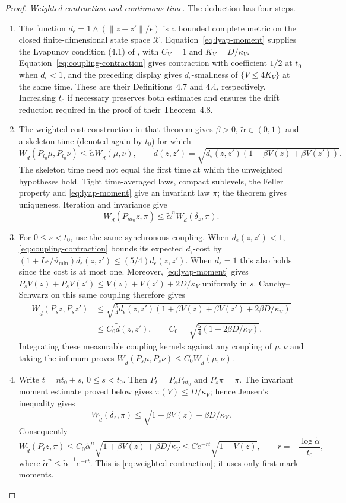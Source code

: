 \begin{proof}
\emph{Weighted contraction and continuous time.} The deduction has four steps.
\begin{enumerate}
\item The function $d_\epsilon=1\wedge(\|z-z'\|/\epsilon)$ is a bounded
complete metric on the closed finite-dimensional state space $\mathcal X$.
Equation~\eqref{eq:lyap-moment} supplies the Lyapunov condition (4.1) of
\citet{HairerMattinglyScheutzow2011}, with $C_V=1$ and $K_V=D/\kappa_V$.
Equation~\eqref{eq:coupling-contraction} gives contraction with coefficient
$1/2$ at $t_0$ when $d_\epsilon<1$, and the preceding display gives
$d_\epsilon$-smallness of $\{V\leq4K_V\}$ at the same time. These are their
Definitions~4.7 and 4.4, respectively. Increasing $t_0$ if necessary preserves
both estimates and ensures the drift reduction required in the proof of their
Theorem~4.8.
\item The weighted-cost construction in that theorem gives $\beta>0$,
$\widetilde\alpha\in(0,1)$ and a skeleton time (denoted again by $t_0$) for
which
\[
 W_{\widetilde d}(P_{t_0}\mu,P_{t_0}\nu)
 \leq\widetilde\alpha W_{\widetilde d}(\mu,\nu),\qquad
 \widetilde d(z,z')=\sqrt{d_\epsilon(z,z')
                  (1+\beta V(z)+\beta V(z'))}.
\]
The skeleton time need not equal the first time at which the unweighted
hypotheses hold. Tight time-averaged laws, compact sublevels, the Feller
property and \eqref{eq:lyap-moment} give an invariant law $\pi$; the theorem
gives uniqueness. Iteration and invariance give
\[
 W_{\widetilde d}(P_{nt_0}z,\pi)
 \leq\widetilde\alpha^n W_{\widetilde d}(\delta_z,\pi).
\]
\item For $0\leq s<t_0$, use the same synchronous coupling. When
$d_\epsilon(z,z')<1$, \eqref{eq:coupling-contraction} bounds its expected
$d_\epsilon$-cost by
$(1+L\epsilon/\vartheta_{\min})d_\epsilon(z,z')\leq(5/4)d_\epsilon(z,z')$.
When $d_\epsilon=1$ this also holds since the cost is at most one. Moreover,
\eqref{eq:lyap-moment} gives
$P_sV(z)+P_sV(z')\leq V(z)+V(z')+2D/\kappa_V$ uniformly in $s$.
Cauchy--Schwarz on this same coupling therefore gives
\[
 \begin{split}
 W_{\widetilde d}(P_sz,P_sz')
 &\leq\sqrt{\tfrac54d_\epsilon(z,z')
    (1+\beta V(z)+\beta V(z')+2\beta D/\kappa_V)}\\
 &\leq C_0\widetilde d(z,z'),\qquad
 C_0=\sqrt{\tfrac54(1+2\beta D/\kappa_V)}.
 \end{split}
\]
Integrating these measurable coupling kernels against any coupling of
$\mu,\nu$ and taking the infimum proves
$W_{\widetilde d}(P_s\mu,P_s\nu)\leq C_0W_{\widetilde d}(\mu,\nu)$.
\item Write $t=nt_0+s$, $0\leq s<t_0$. Then $P_t=P_sP_{nt_0}$ and
$P_s\pi=\pi$. The invariant moment estimate proved below gives
$\pi(V)\leq D/\kappa_V$; hence Jensen's inequality gives
\[
 W_{\widetilde d}(\delta_z,\pi)
 \leq\sqrt{1+\beta V(z)+\beta D/\kappa_V}.
\]
Consequently
\[
 W_{\widetilde d}(P_tz,\pi)
 \leq C_0\widetilde\alpha^n
       \sqrt{1+\beta V(z)+\beta D/\kappa_V}
 \leq Ce^{-rt}\sqrt{1+V(z)},\qquad
 r=-\frac{\log\widetilde\alpha}{t_0},
\]
where $\widetilde\alpha^n\leq\widetilde\alpha^{-1}e^{-rt}$.
This is \eqref{eq:weighted-contraction}; it uses only first mark moments.
\end{enumerate}


\end{proof}
